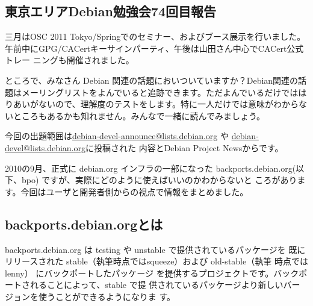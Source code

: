 \documentclass[mingoth,a4paper]{jsarticle}
\begin{document}
\subsection{東京エリアDebian勉強会74回目報告}


三月はOSC 2011 Tokyo/Springでのセミナー、およびブース展示を行いました。
午前中にGPG/CACertキーサインパーティ、午後は山田さん中心でCACert公式トレー
ニングも開催されました。



ところで、みなさん Debian 関連の話題においついていますか？Debian関連の話
題はメーリングリストをよんでいると追跡できます。ただよんでいるだけではは
りあいがないので、理解度のテストをします。特に一人だけでは意味がわからな
いところもあるかも知れません。みんなで一緒に読んでみましょう。

今回の出題範囲は\url{debian-devel-announce@lists.debian.org} や \url{debian-devel@lists.debian.org}に投稿された
内容とDebian Project Newsからです。

\begin{multicols}{2}

\end{multicols}



2010の9月、正式に debian.org インフラの一部になった
backports.debian.org(以下、bpo) ですが、実際にどのように使えばいいのかわからないと
ころがあります。今回はユーザと開発者側からの視点で情報をまとめました。

\subsection{backports.debian.orgとは}

backports.debian.org は
testing や unstable で提供されているパッケージを
既にリリースされた stable（執筆時点ではsqueeze）および old-stable（執筆
時点ではlenny） にバックポートしたパッケージ
を提供するプロジェクトです。バックポートされることによって、stable で提
供されているパッケージより新しいバージョンを使うことができるようになりま
す。
\end{document}

